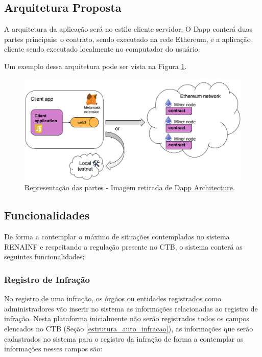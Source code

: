 \subsection{Arquitetura Proposta}

A arquitetura da aplicação será no estilo cliente servidor. O Dapp conterá duas partes principais: o contrato, sendo executado na rede Ethereum, e a aplicação cliente sendo executado localmente no computador do usuário.

Um exemplo dessa arquitetura pode ser vista na Figura \ref{fig:dapp_representacao}.

    \begin{figure}[h]
         \centering
         \includegraphics[scale=0.25]{figuras/capitulo_3/dapp_representacao_comunicacao.png}
         \caption{Representação das partes - Imagem retirada de \href{https://sites.google.com/site/blockchaintutorial/dapp-architecture}{Dapp Architecture}.}
         \label{fig:dapp_representacao}
    \end{figure}



\subsection{Funcionalidades}
\label{section:funcionalidades_propostas}

De forma a contemplar o máximo de situações contempladas no sistema RENAINF e respeitando a regulação presente no CTB, o sistema conterá as seguintes funcionalidades:


    \subsubsection{Registro de Infração}
    
        No registro de uma infração, os órgãos ou entidades registrados como administradores vão inserir no sistema as informações relacionadas ao registro de infração. Nesta plataforma inicialmente não serão registrados todos os campos elencados no CTB (Seção \ref{estrutura_auto_infracao}), as informações que serão cadastrados no sistema para o registro da infração de forma a contemplar as informações nesses campos são:
        
